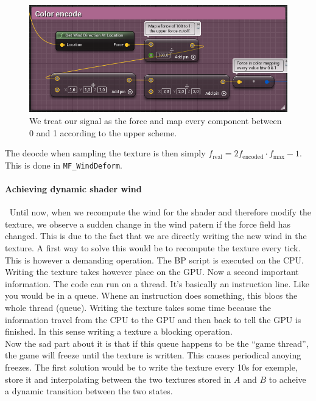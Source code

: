 \documentclass[../main.tex]{subfile}
\begin{document}
\begin{figure}[H]
    \centering
    \includegraphics[width=.7\textwidth]{Ressources/ColorEncode.png}
    \caption{We treat our signal as the force and map every component between 0 and 1 according to the upper scheme.}
\end{figure}

The deocde when sampling the texture is then simply $f_{\text{real}} = 2f_{\text{encoded}}\cdot f_{\text{max}} -1$. This is done in \texttt{MF\_WindDeform}.\\

\paragraph{Achieving dynamic shader wind} $~$ Until now, when we recompute the wind for the shader and therefore modify the texture, we observe a 
sudden change in the wind patern if the force field has changed. This is due to the fact that we are directly writing the new wind in the texture.
A first way to solve this would be to recompute the texture every tick. This is however a demanding operation. The BP script is executed on the CPU.
Writing the texture takes however place on the GPU. Now a second important information. The code can run on a thread. It's basically an instruction line. Like you 
would be in a queue. Whene an instruction does something, this blocs the whole thread (queue). Writing the texture takes some time because the information travel
from the CPU to the GPU and then back to tell the GPU is finished. In this sense writing a texture a blocking operation.\\

Now the sad part about it is that if this queue happens to be the ``game thread'', the game will freeze until the texture is written. This causes periodical anoying freezes.
The first solution would be to write the texture every 10s for exemple, store it and interpolating between the two textures stored in $A$ and $B$ to acheive a dynamic transition between the two states.
\end{document}
